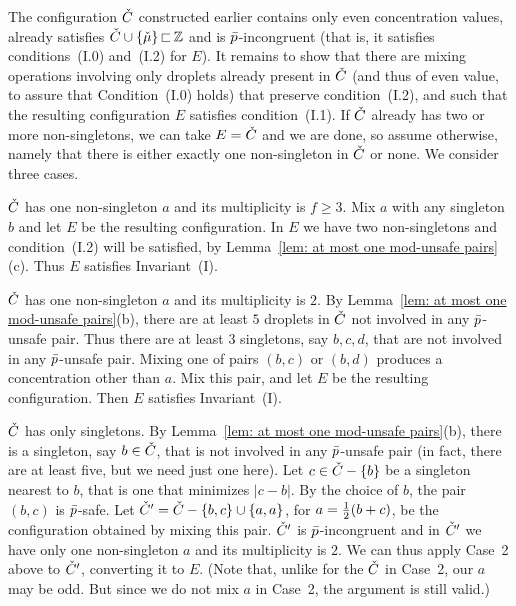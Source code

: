 The configuration ${\check{C}}$ constructed earlier contains only even concentration values,
already satisfies ${\check{C}}\cup{ \left\{ {\check{\mu}}\right\} }{\,\sqsubset\,}{\mathbb Z}$ and is ${\bar{p}}$-incongruent 
(that is, it satisfies conditions~(I.0) and~(I.2) for $E$).  
It remains to show that there are mixing operations involving only droplets 
already present in ${\check{C}}$ (and thus of even value, to assure that 
Condition~(I.0) holds) that preserve condition~(I.2), and such that the resulting
configuration $E$ satisfies condition~(I.1).
If ${\check{C}}$ already has two or more non-singletons, we can take $E = {\check{C}}$ and we are done, 
so assume otherwise, namely that there is either exactly one non-singleton in ${\check{C}}$ or none.
We consider three cases.

\medskip\noindent
{} ${\check{C}}$ has one non-singleton $a$ and its multiplicity is $f\ge 3$.
Mix $a$ with any singleton $b$ and let $E$ be the resulting configuration.
In $E$ we have two non-singletons and condition~(I.2) will be satisfied, 
by Lemma~\ref{lem: at most one mod-unsafe pairs}(c). Thus $E$ satisfies Invariant~(I).

\medskip\noindent
{} ${\check{C}}$ has one non-singleton $a$ and its multiplicity is $2$.
By 	Lemma~\ref{lem: at most one mod-unsafe pairs}(b),
there are at least $5$ droplets in ${\check{C}}$ not involved in any
${\bar{p}}$-unsafe pair. Thus there are at least $3$ singletons, say $b,c,d$,
that are not involved in any ${\bar{p}}$-unsafe pair.
Mixing one of pairs $(b,c)$ or $(b,d)$ produces a concentration other than
$a$. Mix this pair, and let $E$ be the resulting configuration.
Then $E$ satisfies Invariant~(I).

\medskip\noindent
{} ${\check{C}}$ has only singletons.
By Lemma~\ref{lem: at most one mod-unsafe pairs}(b),
there is a singleton, say $b\in {\check{C}}$, that is not involved in any
${\bar{p}}$-unsafe pair (in fact, there are at least five, but we need just one here).
Let $c\in {\check{C}}-{ \left\{ b \right\} }$ be a singleton nearest to $b$, that is one
that minimizes $|c-b|$. By the choice of $b$, the pair $(b,c)$ is
${\bar{p}}$-safe. Let ${\check{C}}' = {\check{C}} - { \left\{ b,c \right\} } \cup{ \left\{ a,a \right\} }$,
for $a={\textstyle\frac{1}{2}}(b+c)$, be the configuration obtained by mixing this pair.
${\check{C}}'$ is ${\bar{p}}$-incongruent and
in ${\check{C}}'$ we have only one non-singleton $a$ and its multiplicity is $2$.
We can thus apply Case~2 above to ${\check{C}}'$, converting it to $E$.
(Note that, unlike for the ${\check{C}}$ in Case~2, our $a$ may be odd. But since we
do not mix $a$ in Case~2, the argument is still valid.)

